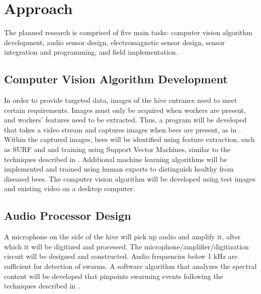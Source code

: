 \section{Approach}

The planned research is comprised of five main tasks: computer vision algorithm development, audio sensor design, electromagnetic sensor design, sensor integration and programming, and field implementation.

\subsection{Computer Vision Algorithm Development}

In order to provide targeted data, images of the hive entrance need to meet certain requirements. Images must only be acquired when workers are present, and workers' features need to be extracted. Thus, a program will be developed that takes a video stream and captures images when bees are present, as in \cite{campbell2008video}. Within the captured images, bees will be identified using feature extraction, such as SURF and and training using Support Vector Machines, similar to the techniques described in \cite{azarcoya2014automatic}. Additional machine learning algorithms will be implemented and trained using human experts to distinguish healthy from diseased bees. The computer vision algorithm will be developed using test images and existing video on a desktop computer.

\subsection{Audio Processor Design}

A microphone on the side of the hive will pick up audio and amplify it, after which it will  be digitized and processed. The microphone/amplifier/digitization circuit will be designed and constructed. Audio frequencies below 1 kHz are sufficient for detection of swarms. A software algorithm that analyzes the spectral content will be developed that pinpoints swarming events following the techniques described in \cite{ferrari2008monitoring}.

